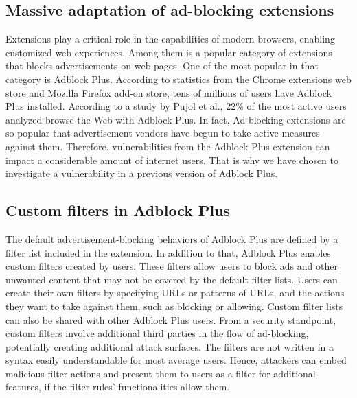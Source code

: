 \documentclass[conference]{IEEEtran}
\begin{document}
\subsection{Massive adaptation of ad-blocking extensions}
Extensions play a critical role in the capabilities of modern browsers, enabling customized web experiences. Among them is a popular category of extensions that blocks advertisements on web pages. One of the most popular in that category is Adblock Plus. According to statistics from the Chrome extensions web store and Mozilla Firefox add-on store, tens of millions of users have Adblock Plus installed. \cite{noauthor_adblockchrome_nodate, noauthor_adblockfirefox_nodate} According to a study by Pujol et al., 22\% of the most active users analyzed browse the Web with Adblock Plus. In fact, Ad-blocking extensions are so popular that advertisement vendors have begun to take active measures against them.\cite{mughees_first_2016} Therefore, vulnerabilities from the Adblock Plus extension can impact a considerable amount of internet users. That is why we have chosen to investigate a vulnerability in a previous version of Adblock Plus.

\subsection{Custom filters in Adblock Plus}
The default advertisement-blocking behaviors of Adblock Plus are defined by a filter list included in the extension. In addition to that, Adblock Plus enables custom filters created by users. These filters allow users to block ads and other unwanted content that may not be covered by the default filter lists. Users can create their own filters by specifying URLs or patterns of URLs, and the actions they want to take against them, such as blocking or allowing. Custom filter lists can also be shared with other Adblock Plus users. From a security standpoint, custom filters involve additional third parties in the flow of ad-blocking, potentially creating additional attack surfaces. The filters are not written in a syntax easily understandable for most average users. Hence, attackers can embed malicious filter actions and present them to users as a filter for additional features, if the filter rules' functionalities allow them.
\end{document}
